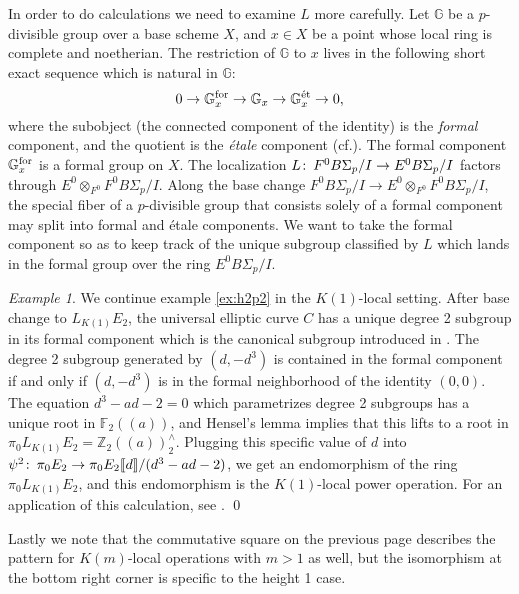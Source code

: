 \documentclass{gtpart}
\theoremstyle{definition}
\theoremstyle{remark}
\newtheorem{exam}[thm]{Example}
\def\co{\colon\thinspace}
\newcommand{\mb}[1]{\mathbb{#1}}
\newcommand{\cff}[2]{cf.\thinspace{\cite[#1]{#2}}}
\begin{document}
In order to do calculations we need to examine $L$ more carefully.  Let 
$\mb G$ be a $p$-divisible group over a base scheme $X$, and $x \in X$ be a 
point whose local ring is complete and noetherian.  The restriction of $\mb G$ 
to $x$ lives in the following short exact sequence which is natural in 
$\mb G$: 
\[
 0 \to {\mb G}^{\rm for}_x \to {\mb G}_x \to {\mb G}^\text{\'et}_x \to 0, 
\]
where the subobject (the connected component of the identity) is the {\em 
formal} component, and the quotient is the {\em \'etale} component 
(\cff{section 2.2}{tate}).  The formal component ${\mb G}^{\rm for}_x$ is a 
formal group on $X$.  The localization 
$L\co F^0 B\Sigma_p/I \to E^0 B\Sigma_p/I$ factors through 
$E^0 \otimes_{F^0} F^0 B\Sigma_p/I$.  Along the base change 
$F^0 B\Sigma_p/I \to E^0 \otimes_{F^0} F^0 B\Sigma_p/I$, the special fiber of 
a $p$-divisible group that consists solely of a formal component may split 
into formal and \'etale components.  We want to take the formal component so 
as to keep track of the unique subgroup classified by $L$ which lands in the 
formal group over the ring $E^0 B\Sigma_p/I$.  

\begin{exam}
\label{ex:h1p2}
 We continue example \ref{ex:h2p2} in the $K(1)$-local setting.  After base 
 change to $L_{K(1)} E_2$, the universal elliptic curve $C$ has a unique 
 degree 2 subgroup in its formal component which is the canonical subgroup 
 introduced in \cite[theorem 1.4]{lubin}.  The degree 2 subgroup generated by 
 $(d,-d^3)$ is contained in the formal component if and only if $(d,-d^3)$ is 
 in the formal neighborhood of the identity $(0,0)$.  The equation 
 $d^3 - a d - 2 = 0$ which parametrizes degree 2 subgroups has a unique root 
 in ${\mb F}_2 (\!(a)\!)$, and Hensel's lemma implies that this lifts to a 
 root in $\pi_0 L_{K(1)} E_2 = {\mb Z}_2 (\!(a)\!)_2^\wedge$.  Plugging this 
 specific value of $d$ into 
 $\psi^2\co \pi_0 E_2 \to \pi_0 E_2 \llbracket d \rrbracket /(d^3-ad-2)$, we 
 get an endomorphism of the ring $\pi_0 L_{K(1)} E_2$, and this endomorphism 
 is the $K(1)$-local power operation.  For an application of this calculation, 
 see \cite[section 6]{level3}.  \qed
\end{exam}

Lastly we note that the commutative square on the previous page describes the 
pattern for $K(m)$-local operations with $m > 1$ as well, but the isomorphism 
at the bottom right corner is specific to the height 1 case.  
\end{document}
